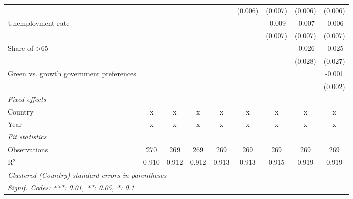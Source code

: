 \begin{table}[htbp]
\begin{tabular}{lcccccccc}
                                                                              &         &         &         &         & (0.006) & (0.007) & (0.006)      & (0.006)\\   
      Unemployment rate                                                       &         &         &         &         &         & -0.009  & -0.007       & -0.006\\   
                                                                              &         &         &         &         &         & (0.007) & (0.007)      & (0.007)\\   
      Share of >65                                                            &         &         &         &         &         &         & -0.026       & -0.025\\   
                                                                              &         &         &         &         &         &         & (0.028)      & (0.027)\\   
      Green vs. growth government preferences                                 &         &         &         &         &         &         &              & -0.001\\   
                                                                              &         &         &         &         &         &         &              & (0.002)\\   
      \emph{Fixed effects}\\
      Country                                                                 & x       & x       & x       & x       & x       & x       & x            & x\\  
      Year                                                                    & x       & x       & x       & x       & x       & x       & x            & x\\  
      \midrule \emph{Fit statistics}\\
      Observations                                                            & 270     & 269     & 269     & 269     & 269     & 269     & 269          & 269\\  
      R$^2$                                                                   & 0.910   & 0.912   & 0.912   & 0.913   & 0.913   & 0.915   & 0.919        & 0.919\\  
      \midrule
      \multicolumn{9}{l}{\emph{Clustered (Country) standard-errors in parentheses}}\\
      \multicolumn{9}{l}{\emph{Signif. Codes: ***: 0.01, **: 0.05, *: 0.1}}\\
   \end{tabular}
\end{table}


